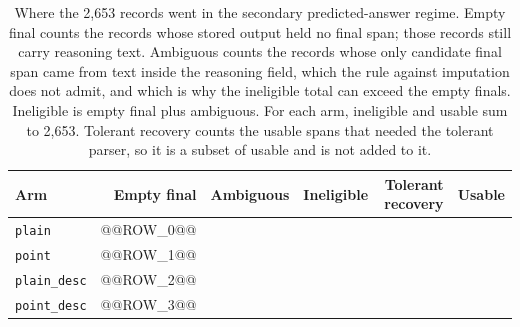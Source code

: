 \begin{table}[ht]
\centering
\caption[Predicted-answer eligibility]{Where the 2,653 records went in the
secondary predicted-answer regime. Empty final counts the records whose stored
output held no final span; those records still carry reasoning text. Ambiguous
counts the records whose only candidate final span came from text inside the
reasoning field, which the rule against imputation does not admit, and which is
why the ineligible total can exceed the empty finals. Ineligible is empty final
plus ambiguous. For each arm, ineligible and
usable sum to 2,653. Tolerant recovery counts the usable spans that needed the
tolerant parser, so it is a subset of usable and is not added to it.}
\label{tab:app-pred-a-coverage}
\begin{tabular}{lrrrrr}
\toprule
Arm & Empty final & Ambiguous & Ineligible & Tolerant recovery & Usable \\
\midrule
\texttt{plain} & @@ROW_0@@ \\
\texttt{point} & @@ROW_1@@ \\
\texttt{plain\_desc} & @@ROW_2@@ \\
\texttt{point\_desc} & @@ROW_3@@ \\
\bottomrule
\end{tabular}
\end{table}
